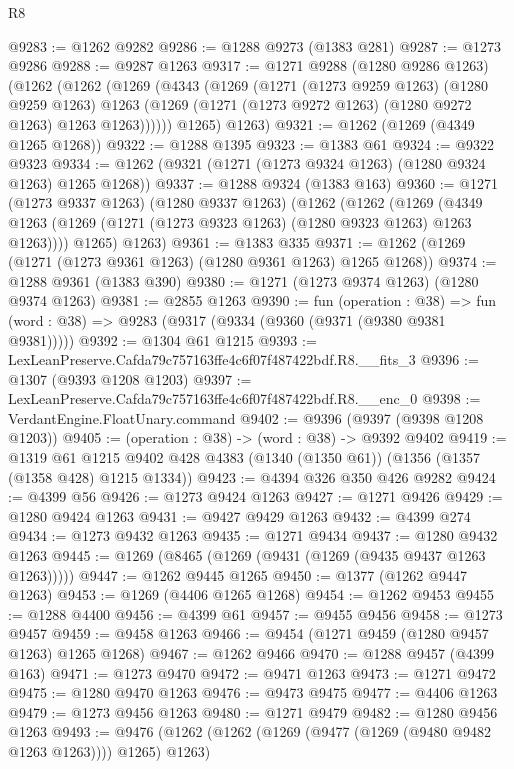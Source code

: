 \begin{lexlean}{R8}
\begin{coremodule}
@9283 := @1262 @9282
@9286 := @1288 @9273 (@1383 @281)
@9287 := @1273 @9286
@9288 := @9287 @1263
@9317 := @1271
    @9288
    (@1280 @9286 @1263)
    (@1262
      (@1262
        (@1269
          (@4343
            (@1269
              (@1271
                (@1273 @9259 @1263)
                (@1280 @9259 @1263)
                @1263
                (@1269 (@1271 (@1273 @9272 @1263) (@1280 @9272 @1263) @1263 @1263))))))
        @1265)
      @1263)
@9321 := @1262 (@1269 (@4349 @1265 @1268))
@9322 := @1288 @1395
@9323 := @1383 @61
@9324 := @9322 @9323
@9334 := @1262 (@9321 (@1271 (@1273 @9324 @1263) (@1280 @9324 @1263) @1265 @1268))
@9337 := @1288 @9324 (@1383 @163)
@9360 := @1271
    (@1273 @9337 @1263)
    (@1280 @9337 @1263)
    (@1262
      (@1262
        (@1269 (@4349 @1263 (@1269 (@1271 (@1273 @9323 @1263) (@1280 @9323 @1263) @1263 @1263))))
        @1265)
      @1263)
@9361 := @1383 @335
@9371 := @1262 (@1269 (@1271 (@1273 @9361 @1263) (@1280 @9361 @1263) @1265 @1268))
@9374 := @1288 @9361 (@1383 @390)
@9380 := @1271 (@1273 @9374 @1263) (@1280 @9374 @1263)
@9381 := @2855 @1263
@9390 := fun (operation : @38) =>
  fun (word : @38) => @9283 (@9317 (@9334 (@9360 (@9371 (@9380 @9381 @9381)))))
@9392 := @1304 @61 @1215
@9393 := LexLeanPreserve.Cafda79c757163ffe4c6f07f487422bdf.R8.__fits_3
@9396 := @1307 (@9393 @1208 @1203)
@9397 := LexLeanPreserve.Cafda79c757163ffe4c6f07f487422bdf.R8.__enc_0
@9398 := VerdantEngine.FloatUnary.command
@9402 := @9396 (@9397 (@9398 @1208 @1203))
@9405 := (operation : @38) -> (word : @38) -> @9392 @9402
@9419 := @1319
    @61
    @1215
    @9402
    @428
    @4383
    (@1340 (@1350 @61))
    (@1356 (@1357 (@1358 @428) @1215 @1334))
@9423 := @4394 @326 @350 @426 @9282
@9424 := @4399 @56
@9426 := @1273 @9424 @1263
@9427 := @1271 @9426
@9429 := @1280 @9424 @1263
@9431 := @9427 @9429 @1263
@9432 := @4399 @274
@9434 := @1273 @9432 @1263
@9435 := @1271 @9434
@9437 := @1280 @9432 @1263
@9445 := @1269 (@8465 (@1269 (@9431 (@1269 (@9435 @9437 @1263 @1263)))))
@9447 := @1262 @9445 @1265
@9450 := @1377 (@1262 @9447 @1263)
@9453 := @1269 (@4406 @1265 @1268)
@9454 := @1262 @9453
@9455 := @1288 @4400
@9456 := @4399 @61
@9457 := @9455 @9456
@9458 := @1273 @9457
@9459 := @9458 @1263
@9466 := @9454 (@1271 @9459 (@1280 @9457 @1263) @1265 @1268)
@9467 := @1262 @9466
@9470 := @1288 @9457 (@4399 @163)
@9471 := @1273 @9470
@9472 := @9471 @1263
@9473 := @1271 @9472
@9475 := @1280 @9470 @1263
@9476 := @9473 @9475
@9477 := @4406 @1263
@9479 := @1273 @9456 @1263
@9480 := @1271 @9479
@9482 := @1280 @9456 @1263
@9493 := @9476 (@1262 (@1262 (@1269 (@9477 (@1269 (@9480 @9482 @1263 @1263)))) @1265) @1263)

\end{coremodule}
\end{lexlean}
